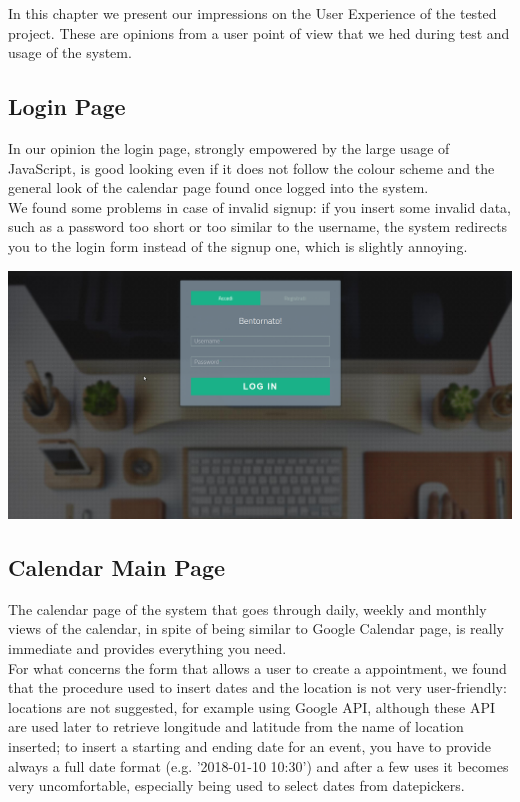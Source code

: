 In this chapter we present our impressions on the User Experience of the tested project. These are opinions from a user point of view that we hed during test and usage of the system.

\subsection{Login Page}

In our opinion the login page, strongly empowered by the large usage of JavaScript, is good looking even if it does not follow the colour scheme and the general look of the calendar page found once logged into the system. \\
We found some problems in case of invalid signup: if you insert some invalid data, such as a password too short or too similar to the username, the system redirects you to the login form instead of the signup one, which is slightly annoying.

\begin{center}
\includegraphics[width=\textwidth]{Images/LoginPage}
\end{center}

\subsection{Calendar Main Page}

The calendar page of the system that goes through daily, weekly and monthly views of the calendar, in spite of being similar to Google Calendar page, is really immediate and provides everything you need. \\
For what concerns the form that allows a user to create a appointment, we found that the procedure used to insert dates and the location is not very user-friendly: locations are not suggested, for example using Google API, although these API are used later to retrieve longitude and latitude from the name of location inserted; to insert a starting and ending date for an event, you have to provide always a full date format (e.g. '2018-01-10 10:30') and after a few uses it becomes very uncomfortable, especially being used to select dates from datepickers.

